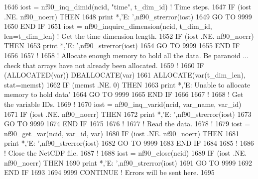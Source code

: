 \begin{DoxyCode}
1646     iost    = nf90\_inq\_dimid(ncid, \textcolor{stringliteral}{"time"}, t\_dim\_id)                            \textcolor{comment}{! Time steps.}
1647     \textcolor{keywordflow}{IF} (iost .NE. nf90\_noerr) \textcolor{keywordflow}{THEN}
1648         print *,\textcolor{stringliteral}{'E: '},nf90\_strerror(iost)
1649         \textcolor{keywordflow}{GO TO} 9999
1650 \textcolor{keywordflow}{    END IF}
1651     iost    = nf90\_inquire\_dimension(ncid, t\_dim\_id, len=t\_dim\_len)             \textcolor{comment}{! Get the time dimension
       length.}
1652     \textcolor{keywordflow}{IF} (iost .NE. nf90\_noerr) \textcolor{keywordflow}{THEN}
1653         print *,\textcolor{stringliteral}{'E: '},nf90\_strerror(iost)
1654         \textcolor{keywordflow}{GO TO} 9999
1655 \textcolor{keywordflow}{    END IF}
1656 
1657     \textcolor{comment}{!}
1658     \textcolor{comment}{! Allocate enough memory to hold all the data. Be paranoid ... check that arrays have not already been
       allocated.}
1659     \textcolor{comment}{!}
1660     \textcolor{keywordflow}{IF} (\textcolor{keyword}{ALLOCATED}(var))           \textcolor{keyword}{DEALLOCATE}(var)
1661     \textcolor{keyword}{ALLOCATE}(var(t\_dim\_len), stat=memst)
1662     \textcolor{keywordflow}{IF} (memst .NE. 0) \textcolor{keywordflow}{THEN}
1663         print *,\textcolor{stringliteral}{'E: Unable to allocate memory to hold data'}
1664         \textcolor{keywordflow}{GO TO} 9999
1665 \textcolor{keywordflow}{    END IF}
1666 
1667     \textcolor{comment}{!}
1668     \textcolor{comment}{! Get the variable IDs.}
1669     \textcolor{comment}{!}
1670     iost = nf90\_inq\_varid(ncid, var\_name, var\_id)
1671     \textcolor{keywordflow}{IF} (iost .NE. nf90\_noerr) \textcolor{keywordflow}{THEN}
1672         print *,\textcolor{stringliteral}{'E: '},nf90\_strerror(iost)
1673         \textcolor{keywordflow}{GO TO} 9999
1674 \textcolor{keywordflow}{    END IF}
1675 
1676     \textcolor{comment}{!}
1677     \textcolor{comment}{! Read the data.}
1678     \textcolor{comment}{!}
1679     iost = nf90\_get\_var(ncid, var\_id, var)
1680     \textcolor{keywordflow}{IF} (iost .NE. nf90\_noerr) \textcolor{keywordflow}{THEN}
1681         print *,\textcolor{stringliteral}{'E: '},nf90\_strerror(iost)
1682         \textcolor{keywordflow}{GO TO} 9999
1683 \textcolor{keywordflow}{    END IF}
1684 
1685     \textcolor{comment}{!}
1686     \textcolor{comment}{! Close the NetCDF file.}
1687     \textcolor{comment}{!}
1688     iost    = nf90\_close(ncid)
1689     \textcolor{keywordflow}{IF} (iost .NE. nf90\_noerr) \textcolor{keywordflow}{THEN}
1690         print *,\textcolor{stringliteral}{'E: '},nf90\_strerror(iost)
1691         \textcolor{keywordflow}{GO TO} 9999
1692 \textcolor{keywordflow}{    END IF}
1693 
1694     9999 \textcolor{keywordflow}{CONTINUE}       \textcolor{comment}{! Errors will be sent here.}
1695 
\end{DoxyCode}



